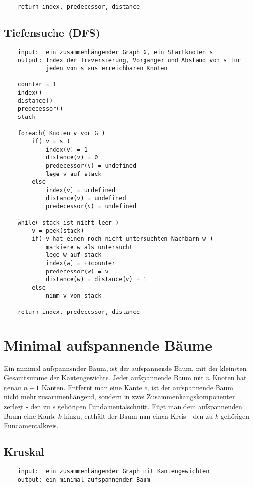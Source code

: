 \documentclass[10pt,a4paper,landscape]{article}
\begin{document}
\begin{multicols*}{2}
\begin{verbatim}
    return index, predecessor, distance
            \end{verbatim}
            
            \subsection{ Tiefensuche (DFS) }
            \begin{verbatim}
    input:  ein zusammenhängender Graph G, ein Startknoten s
    output: Index der Traversierung, Vorgänger und Abstand von s für 
            jeden von s aus erreichbaren Knoten

    counter = 1
    index()
    distance()
    predecessor()
    stack

    foreach( Knoten v von G )
        if( v = s )
            index(v) = 1
            distance(v) = 0
            predecessor(v) = undefined
            lege v auf stack
        else
            index(v) = undefined
            distance(v) = undefined
            predecessor(v) = undefined

    while( stack ist nicht leer )
        v = peek(stack)
        if( v hat einen noch nicht untersuchten Nachbarn w )
            markiere w als untersucht
            lege w auf stack
            index(w) = ++counter
            predecessor(w) = v
            distance(w) = distance(v) + 1
        else
            nimm v von stack

    return index, predecessor, distance
            \end{verbatim}


        \section{ Minimal aufspannende Bäume }
            Ein minimal aufspannender Baum, ist der aufspannende Baum, mit der kleinsten Gesamtsumme der Kantengewichte.
            Jeder aufspannende Baum mit $n$ Knoten hat genau $n-1$ Kanten. Entfernt man eine Kante $e$, ist der 
            aufspannende Baum nicht mehr zusammenhängend, sondern in zwei Zusammenhangskomponenten zerlegt - den zu $e$ 
            gehörigen Fundamentalschnitt. Fügt man dem aufspannenden Baum eine Kante $k$ hinzu, enthält der Baum nun 
            einen Kreis - den zu $k$ gehörigen Fundamentalkreis.
            \subsection{ Kruskal }
            \begin{verbatim}
    input:  ein zusammenhängender Graph mit Kantengewichten
    output: ein minimal aufspannender Baum


\end{verbatim}
\end{multicols*}
\end{document}
